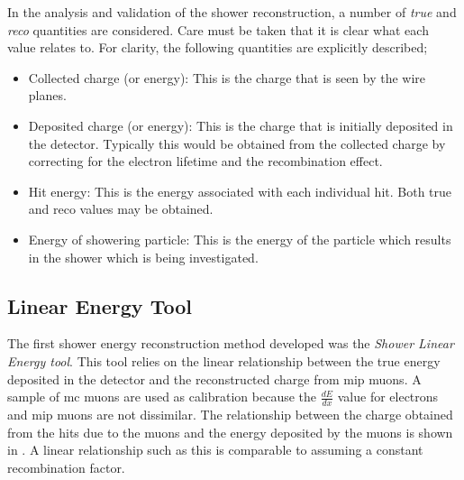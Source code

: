 In the analysis and validation of the shower reconstruction, a number of \textit{true} and \textit{reco} quantities are considered. Care must be taken that it is clear what each value relates to. For clarity, the following quantities are explicitly described;
\begin{itemize}
    \item Collected charge (or energy): This is the charge that is seen by the wire planes. 
    \item Deposited charge (or energy): This is the charge that is initially deposited in the detector. Typically this would be obtained from the collected charge by correcting for the electron lifetime and the recombination effect.
    \item Hit energy: This is the energy associated with each individual hit. Both true and reco values may be obtained.
    \item Energy of showering particle: This is the energy of the particle which results in the shower which is being investigated. 
\end{itemize}
\subsection{Linear Energy Tool}\label{subchap:Linear Energy Tool}
The first shower energy reconstruction method developed was the \textit{Shower Linear Energy tool}. This tool relies on the linear relationship between the true energy deposited in the detector and the reconstructed charge from \gls{mip} muons. A sample of \Gls{mc} muons are used as calibration because the $\frac{dE}{dx}$ value for electrons and \Gls{mip} muons are not dissimilar. The relationship between the charge obtained from the hits due to the muons and the energy deposited by the muons is shown in . A linear relationship such as this is comparable to assuming a constant recombination factor. 




